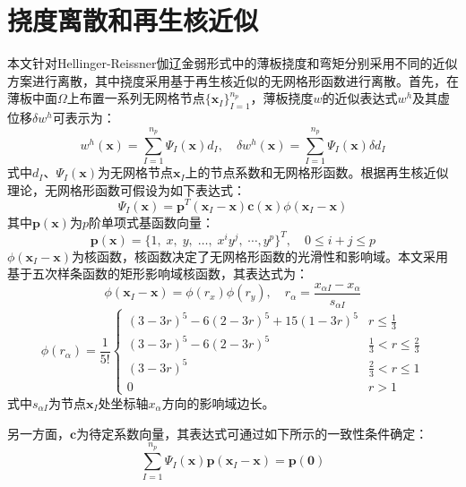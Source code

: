 \documentclass[a4paper]{article}
\begin{document}
\section{挠度离散和再生核近似}
本文针对Hellinger-Reissner伽辽金弱形式中的薄板挠度和弯矩分别采用不同的近似方案进行离散，其中挠度采用基于再生核近似的无网格形函数进行离散。首先，在薄板中面$\Omega$上布置一系列无网格节点$\{\pmb{x}_I\}_{I=1}^{n_p}$，薄板挠度$w$的近似表达式$w^h$及其虚位移$\delta w^h$可表示为：
\begin{equation}
    w^h(\pmb{x})=\sum_{I=1}^{n_p}\Psi_I(\pmb{x})d_I,\quad \delta w^h(\pmb{x})=\sum_{I=1}^{n_p}\Psi_I(\pmb{x})\delta d_I
\end{equation}
式中$d_{I}$、$\Psi_I(\pmb{x})$为无网格节点$\pmb{x}_I$上的节点系数和无网格形函数。根据再生核近似理论，无网格形函数可假设为如下表达式：
\begin{equation}\label{shapefunction}
    \Psi_I(\pmb{x})=\pmb{p}^T(\pmb{x}_I-\pmb{x})\pmb{c}(\pmb{x})\phi(\pmb{x}_I-\pmb{x})
\end{equation}
其中$\pmb{p}(\pmb{x})$为$p$阶单项式基函数向量：
\begin{equation}
    \pmb{p}(\pmb{x})=\{1,\;x,\;y,\;\dots,\;x^iy^j,\;\dotsb,y^p\}^T,\quad 0\le i+j\le p
\end{equation}
$\phi(\pmb{x}_I-\pmb{x})$为核函数，核函数决定了无网格形函数的光滑性和影响域。本文采用基于五次样条函数的矩形影响域核函数，其表达式为：
\begin{equation}
    \phi(\pmb{x}_I-\pmb{x})=\phi(r_x)\phi(r_y),\quad r_{\alpha}=\frac{x_{\alpha I}-x_{\alpha}}{s_{\alpha I}}
\end{equation}
\begin{equation}
    \phi(r_{\alpha})=\frac{1}{5!}\begin{cases}
        (3-3r)^5-6(2-3r)^5+15(1-3r)^5&r\le\frac{1}{3}\\
        (3-3r)^5-6(2-3r)^5&\frac{1}{3}<r\le\frac{2}{3}\\
        (3-3r)^5&\frac{2}{3}<r\le1\\
        0&r>1
    \end{cases}
\end{equation}
式中$s_{\alpha I}$为节点$\boldsymbol x_I$处坐标轴$x_\alpha$方向的影响域边长。 \par
另一方面，$\pmb{c}$为待定系数向量，其表达式可通过如下所示的一致性条件确定：
\begin{equation}\label{cc}
    \sum_{I=1}^{n_p}\Psi_I(\boldsymbol x)\boldsymbol{p}(\boldsymbol x_I-\boldsymbol x) = \boldsymbol{p}(\boldsymbol{0})
\end{equation}
\end{document}
